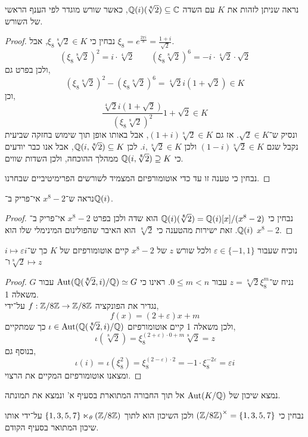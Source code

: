 \subquestion{}
נראה שניתן לזהות את $K$ עם השדה $\mathbb{Q}(i)(\sqrt[8]{2}) \subseteq \mathbb{C}$,
כאשר שורש מוגדר לפי הענף הראשי של השורש.
\begin{proof}
	נבחין כי $\xi_8 \sqrt[8]{2} \in K$, אבל $\xi_8 = e^{\frac{2\pi i}{8}} = \frac{1 + i}{\sqrt{2}}$.
	\[
		{(\xi_8 \sqrt[8]{2})}^2
		= i \cdot \sqrt[4]{2}
		\qquad
		{(\xi_8 \sqrt[8]{2})}^6
		= -i \cdot \sqrt[4]{2} \cdot \sqrt{2}
	\]
	ולכן בפרט גם,
	\[
		{(\xi_8 \sqrt[8]{2})}^2 - {(\xi_8 \sqrt[8]{2})}^6
		= \sqrt[4]{2} i (1 + \sqrt{2})
		\in K
	\]
	וכן,
	\[
		\frac{\sqrt[4]{2} i (1 + \sqrt{2})}{{(\xi_8 \sqrt[8]{2})}^2}
		1 + \sqrt{2} \in K
	\]
	ונסיק ש־$\sqrt{2} \in K$.
	אז גם $(1 + i) \sqrt[8]{2} \in K$, אבל באותו אופן תוך שימוש בחזקה שביעית נקבל שגם $(1 - i) \sqrt[8]{2} \in K$ ולכן $i, \sqrt[8]{2} \in K$.
	לכן $\mathbb{Q}(i, \sqrt[8]{2}) \subseteq K$, אבל אנו כבר יודעים כי $\mathbb{Q}(i, \sqrt[8]{2}) \supseteq K$ ממהלך ההוכחה, ולכן השדות שווים.

	נבחין כי טענה זו עד כדי אוטומורפיזם המצמיד לשורשים הפרימיטיביים שבחרנו.
\end{proof}

\subquestion{}
נראה ש־$x^8 - 2$ אי־פריק ב־$\mathbb{Q}(i)$.
\begin{proof}
	נבחין כי $\mathbb{Q}(i)(\sqrt[8]{2}) = \mathbb{Q}(i)[x] / (x^8 - 2)$ הוא שדה ולכן בפרט $x^8 - 2$ אי־פריק ב־$\mathbb{Q}(i)$.
	זאת ישירות מהטענה כי $\sqrt[8]{2}$ הוא האיבר שהפולינום המינימלי שלו הוא $x^8 - 2$.
\end{proof}

\subquestion{}
נוכיח שעבור $\varepsilon \in \{-1, 1\}$ ולכל שורש $z$ של $x^8 - 2$ קיים אוטומורפיזם של $K$ כך ש־$i \mapsto \varepsilon i$ ו־$\sqrt[8]{2} \mapsto z$
\begin{proof}
	נניח ש־$z = \sqrt[8]{2} \xi_8^m$ עבור $0 \le m < n$.
	ראינו כי $\operatorname{Aut}(\mathbb{Q}(\sqrt[8]{2}, i) / \mathbb{Q}) \simeq G$ עבור $G$ משאלה 1. \\
	נגדיר את הפונקציה $f : \mathbb{Z} / 8\mathbb{Z} \to \mathbb{Z} / 8\mathbb{Z}$ על־ידי,
	\[
		f(x) = (2 + \varepsilon) x + m
	\]
	ולכן משאלה 1 קיים אוטומורפיזם $\iota \in \operatorname{Aut}(\mathbb{Q}(\sqrt[8]{2}, i) / \mathbb{Q})$ כך שמתקיים,
	\[
		\iota(\sqrt[8]{2})
		= \xi_8^{(2 + \varepsilon) \cdot 0 + m} \sqrt[8]{2}
		= z
	\]
	בנוסף גם,
	\[
		\iota(i)
		= \iota(\xi_8^2)
		= \xi_8^{(2 - \varepsilon) \cdot 2}
		= -1 \cdot \xi_8^{-2\varepsilon}
		= \varepsilon i
	\]
	ומצאנו אוטומורפיזם המקיים את הרצוי.
\end{proof}

\subquestion{}
נמצא שיכון של $\operatorname{Aut}(K / \mathbb{Q})$ אל תוך החבורה המתוארת בסעיף א' ונמצא את תמונתה.
\begin{solution}
	נבחין כי ${(\mathbb{Z} / 8 \mathbb{Z})}^\times = \{1, 3, 5, 7\}$ ולכן השיכון הוא לתוך $\{1, 3, 5, 7\} \ltimes_{\theta} (\mathbb{Z} / 8\mathbb{Z})$ על־ידי אותו שיכון המתואר בסעיף הקודם.
\end{solution}

